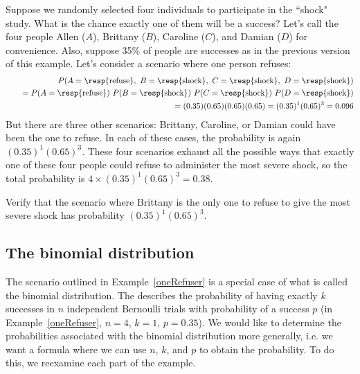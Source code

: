 \begin{examplewrap}
\begin{nexample}{Suppose we randomly selected four individuals to participate in the ``shock" study. What is the chance exactly one of them will be a success?  Let's call the four people Allen ($A$), Brittany ($B$), Caroline ($C$), and Damian ($D$) for convenience. Also, suppose 35\% of people are successes as in the previous version of this example.}\label{oneRefuser}
Let's consider a scenario where one person refuses:
\begin{eqnarray*}
&&P(A=\text{\resp{refuse}},\text{ }B=\text{\resp{shock}},\text{ }C=\text{\resp{shock}},\text{ }D=\text{\resp{shock}}) \\
 &&\quad =  P(A=\text{\resp{refuse}})\ P(B=\text{\resp{shock}})\ P(C=\text{\resp{shock}})\ P(D=\text{\resp{shock}}) \\
 &&\quad =  (0.35)  (0.65)  (0.65)  (0.65) = (0.35)^1 (0.65)^3 = 0.096
\end{eqnarray*}
But there are three other scenarios: Brittany, Caroline, or Damian could have been the one to refuse. In each of these cases, the probability is again $(0.35)^1(0.65)^3$. These four scenarios exhaust all the possible ways that exactly one of these four people could refuse to administer the most severe shock, so the total probability is $4\times(0.35)^1(0.65)^3 = 0.38$.
\end{nexample}
\end{examplewrap}

\begin{exercisewrap}
\begin{nexercise}
Verify that the scenario where Brittany is the only one to refuse to give the most severe shock has probability $(0.35)^1(0.65)^3$.~\footnotemark
\end{nexercise}
\end{exercisewrap}


\subsection{The binomial distribution}

The scenario outlined in Example~\ref{oneRefuser} is a special case of what is called the binomial distribution. The  describes the probability of having exactly $k$ successes in $n$ independent Bernoulli trials with probability of a success $p$  (in Example~\ref{oneRefuser}, $n=4$, $k=1$, $p=0.35$). We would like to determine the probabilities associated with the binomial distribution more generally, i.e. we want a formula where we can use $n$, $k$, and $p$ to obtain the probability. To do this, we reexamine each part of the example.

